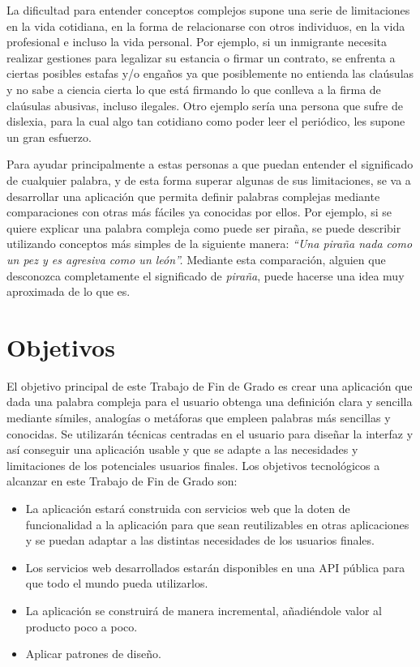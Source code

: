 La dificultad para entender conceptos complejos supone una serie de limitaciones en la vida cotidiana, en la forma de relacionarse con otros individuos, en la vida profesional e incluso la vida personal. Por ejemplo, si un inmigrante necesita realizar gestiones para legalizar su estancia o firmar un contrato, se enfrenta a ciertas posibles estafas y/o engaños ya que posiblemente no entienda las claúsulas y no sabe a ciencia cierta lo que está firmando lo que conlleva a la firma de claúsulas abusivas, incluso ilegales. Otro ejemplo sería una persona que sufre de dislexia, para la cual algo tan cotidiano como poder leer el periódico, les supone un gran esfuerzo.


Para ayudar principalmente a estas personas a que puedan entender el significado de cualquier palabra, y de esta forma superar algunas de sus limitaciones, se va a desarrollar una aplicación que permita definir palabras complejas mediante comparaciones con otras más fáciles ya conocidas por ellos. Por ejemplo, si se quiere explicar una palabra compleja como puede ser piraña, se puede describir utilizando conceptos más simples de la siguiente manera:\textit{ ``Una piraña nada como un pez y es agresiva como un león''.} Mediante esta comparación, alguien que desconozca completamente el significado de \textit{piraña}, puede hacerse una idea muy aproximada de lo que es.


\section{Objetivos}
\label{cap:sec:objetivos}

El objetivo principal de este Trabajo de Fin de Grado es crear una aplicación que dada una palabra compleja para el usuario obtenga una definición clara y sencilla mediante símiles, analogías o metáforas que empleen palabras más sencillas y conocidas. 
Se utilizarán técnicas centradas en el usuario para diseñar la interfaz y así conseguir una aplicación usable y que se adapte a las necesidades y limitaciones de los potenciales usuarios finales.
Los objetivos tecnológicos a alcanzar en este Trabajo de Fin de Grado son:
\begin{itemize}
	\item La aplicación estará construida con servicios web que la doten de funcionalidad a la aplicación para que sean reutilizables en otras aplicaciones y se puedan adaptar a las distintas necesidades de los usuarios finales.
	\item Los servicios web desarrollados estarán disponibles en una API pública para que todo el mundo pueda utilizarlos.	
	\item La aplicación se construirá de manera incremental, añadiéndole valor al producto poco a poco.	
	\item Aplicar patrones de diseño.
\end{itemize}

